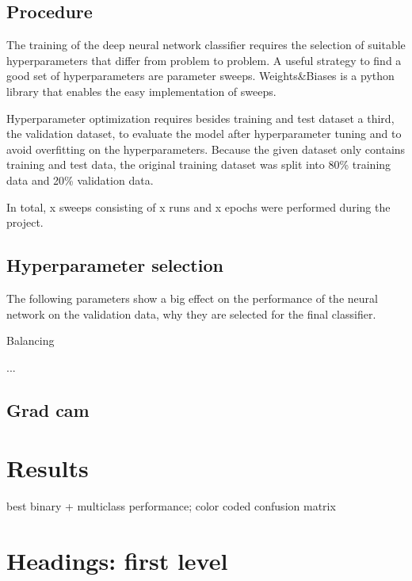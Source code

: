 \documentclass{article}
\begin{document}
\subsection{Procedure}
The training of the deep neural network classifier requires the selection of suitable hyperparameters that differ from
problem to problem. A useful strategy to find a good set of hyperparameters are parameter sweeps. Weights\&Biases is a 
python library that enables the easy implementation of sweeps. 

Hyperparameter optimization requires besides training and test dataset a third, the validation dataset, to evaluate the
model after hyperparameter tuning and to avoid overfitting on the hyperparameters. Because the given dataset only contains 
training and test data, the original training dataset was split into 80\% training data and 20\% validation data.

In total, x sweeps consisting of x runs and x epochs were performed during the project.

\subsection{Hyperparameter selection}
The following parameters show a big effect on the performance of the neural network on the validation data, 
why they are selected for the final classifier.

Balancing

...

\subsection{Grad cam}
\section{Results}
best binary + multiclass performance;
color coded confusion matrix

\section{Headings: first level}
\label{sec:headings}
\end{document}
